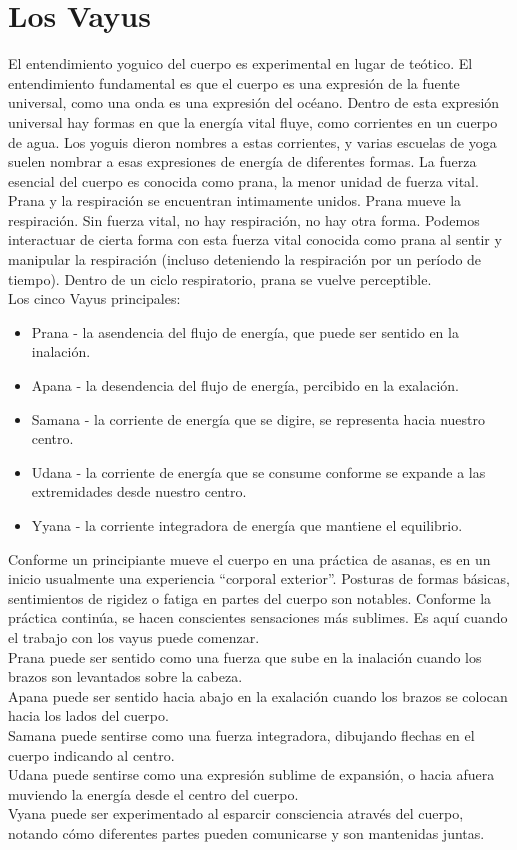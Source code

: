 \section{Los Vayus}
El entendimiento yoguico del cuerpo es experimental en lugar de teótico. El entendimiento fundamental es que el cuerpo es una expresión de la fuente universal, como una onda es una expresión del oc\'eano.  Dentro de esta expresión universal hay formas en que la energía vital fluye, como corrientes en un cuerpo de agua. Los yoguis dieron nombres a estas corrientes, y varias escuelas de yoga suelen nombrar a esas expresiones de energía de diferentes formas. La fuerza esencial del cuerpo es conocida como prana, la menor unidad de fuerza vital.\\
Prana y la respiración se encuentran intimamente unidos. Prana mueve la respiración. Sin fuerza vital, no hay respiración, no hay otra forma. Podemos interactuar de cierta forma con esta fuerza vital conocida como prana al sentir y manipular la respiración (incluso deteniendo la respiración por un período de tiempo). Dentro de un ciclo respiratorio, prana se vuelve perceptible.\\
Los cinco Vayus principales:
\begin{itemize}
	\item Prana - la asendencia del flujo de energía, que puede ser sentido en la inalación.
	\item Apana - la desendencia del flujo de energía, percibido en la exalación.
	\item Samana - la corriente de energía que se digire, se representa hacia nuestro centro.
	\item Udana - la corriente de energía que se consume conforme se expande a las extremidades desde nuestro centro.
	\item Yyana - la corriente integradora de energía que mantiene el equilibrio.
\end {itemize}
Conforme un principiante mueve el cuerpo en una práctica de asanas, es en un inicio usualmente una experiencia ``corporal exterior''. Posturas de formas básicas, sentimientos de rigidez o fatiga en partes del cuerpo son notables. Conforme la práctica continúa, se hacen conscientes  sensaciones más sublimes. Es aquí cuando el trabajo con los vayus puede comenzar.\\
Prana puede ser sentido como una fuerza que sube en la inalación cuando los brazos son levantados sobre la cabeza.\\
Apana puede ser sentido hacia abajo en la exalación cuando los brazos se colocan hacia los lados del cuerpo.\\
Samana puede sentirse como una fuerza integradora, dibujando flechas en el cuerpo indicando al centro.\\
Udana puede sentirse como una expresión sublime de expansión, o hacia afuera muviendo la energía desde el centro del cuerpo.\\
Vyana puede ser experimentado al esparcir consciencia atrav\'es del cuerpo, notando cómo diferentes partes pueden comunicarse y son mantenidas juntas.
